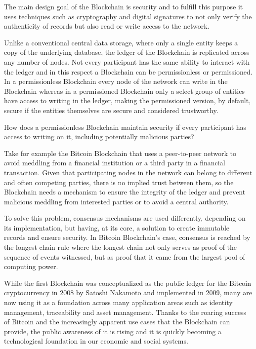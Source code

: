 \documentclass[]{llncs}
\begin{document}
The main design goal of the Blockchain is security and to fulfill this purpose it uses techniques 
such as cryptography and digital signatures to not only verify the authenticity of records but also 
read or write access to the network.

Unlike a conventional central data storage, where only a single entity keeps a copy of the 
underlying database, the ledger of the Blockchain is replicated across any number of nodes. 
Not every participant has the same ability to interact with the ledger and in this respect 
a Blockchain can be permissionless or permissioned. In a permissionless Blockchain every node of 
the network can write in the Blockchain whereas in a permissioned Blockchain only a select group 
of entities have access to writing in the ledger, making the permissioned version, by default, 
secure if the entities themselves are secure and considered trustworthy.

How does a permissionless Blockchain maintain security if every participant has access to 
writing on it, including potentially malicious parties?

Take for example the Bitcoin Blockchain that uses a peer-to-peer network to avoid meddling 
from a financial institution or a third party in a financial transaction. Given that participating 
nodes in the network can belong to different and often competing parties, there is no implied trust 
between them, so the Blockchain needs a mechanism to ensure the integrity of the ledger and prevent 
malicious meddling from interested parties or to avoid a central authority.\cite{Barclay2017}

To solve this problem, consensus mechanisms are used differently, depending on its implementation, 
but having, at its core, a solution to create immutable records and ensure security. 
In Bitcoin Blockchain’s case, consensus is reached by the longest chain rule where the 
longest chain not only serves as proof of the sequence of events witnessed, 
but as proof that it came from the largest pool of computing power.\cite{Baars2016}

While the first Blockchain was conceptualized as the public ledger for the Bitcoin cryptocurrency 
in 2008 by Satoshi Nakamoto and implemented in 2009, many are now using it as a foundation across 
many application areas such as identity management, traceability and asset management. 
Thanks to the roaring success of Bitcoin and the increasingly apparent use cases that the 
Blockchain can provide, the public awareness of it is rising and it is quickly becoming a 
technological foundation in our economic and social systems.
\end{document}
